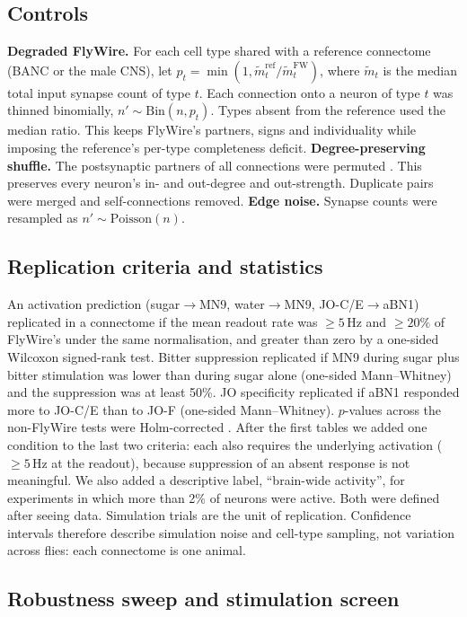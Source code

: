 \subsection*{Controls}
\textbf{Degraded FlyWire.} For each cell type shared with a reference connectome (BANC or the
male CNS), let $p_t=\min(1,\tilde{m}^{\mathrm{ref}}_t/\tilde{m}^{\mathrm{FW}}_t)$, where
$\tilde{m}_t$ is the median total input synapse count of type $t$. Each connection onto a
neuron of type $t$ was thinned binomially, $n'\sim\mathrm{Bin}(n,p_t)$. Types absent from the
reference used the median ratio. This keeps FlyWire's partners, signs and individuality while
imposing the reference's per-type completeness deficit.
\textbf{Degree-preserving shuffle.} The postsynaptic partners of all connections were permuted
\citep{maslov2002}. This preserves every neuron's in- and out-degree and out-strength.
Duplicate pairs were merged and self-connections removed.
\textbf{Edge noise.} Synapse counts were resampled as $n'\sim\mathrm{Poisson}(n)$.

\subsection*{Replication criteria and statistics}
An activation prediction (sugar$\to$MN9, water$\to$MN9, JO-C/E$\to$aBN1) replicated in a
connectome if the mean readout rate was $\ge5$\,Hz and $\ge20\%$ of FlyWire's under the same
normalisation, and greater than zero by a one-sided Wilcoxon signed-rank test. Bitter
suppression replicated if MN9 during sugar plus bitter stimulation was lower than during sugar
alone (one-sided Mann--Whitney) and the suppression was at least 50\%. JO specificity
replicated if aBN1 responded more to JO-C/E than to JO-F (one-sided Mann--Whitney).
$p$-values across the non-FlyWire tests were Holm-corrected \citep{holm1979}.
After the first tables we added one condition to the last two criteria: each also requires
the underlying activation ($\ge5$\,Hz at the readout), because suppression of an absent
response is not meaningful. We also added a descriptive label, ``brain-wide activity'', for
experiments in which more than 2\% of neurons were active. Both were defined after seeing
data.
Simulation trials are the unit of replication. Confidence intervals therefore describe
simulation noise and cell-type sampling, not variation across flies: each connectome is one
animal.

\subsection*{Robustness sweep and stimulation screen}
